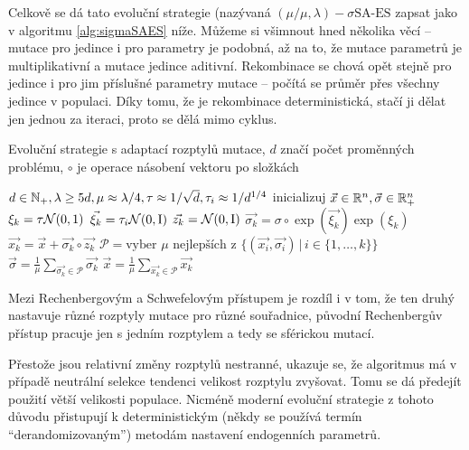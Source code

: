 Celkově se dá tato evoluční strategie (nazývaná $(\mu/\mu, \lambda)-\sigma\text{SA-ES}$ zapsat jako v algoritmu \ref{alg:sigmaSAES} níže. Můžeme si všimnout hned několika věcí -- mutace pro jedince i pro parametry je podobná, až na to, že mutace parametrů je multiplikativní a mutace jedince aditivní. Rekombinace se chová opět stejně pro jedince i pro jim příslušné parametry mutace -- počítá se průměr přes všechny jedince v populaci. Díky tomu, že je rekombinace deterministická, stačí ji dělat jen jednou za iteraci, proto se dělá mimo  cyklus.

\begin{algorithm}
\caption{Evoluční strategie s adaptací rozptylů mutace, $d$ značí počet proměnných problému, $\circ$ je operace násobení vektoru po složkách}
\label{alg:sigmaSAES}
\begin{algorithmic}
\Require $d \in {\mathbb{N}}_+, \lambda \geq 5d, \mu \approx \lambda/4, \tau \approx 1/\sqrt{d}, \tau_i \approx 1/d^{1/4}$
\State inicializuj $\vec{x} \in {\ensuremath{\mathbb{R}}}^n, \vec{\sigma} \in {\ensuremath{\mathbb{R}}}^n_+$
		\State $\xi_k = \tau\mathcal{N}(0, 1)$ 
		\State $\vec{\xi_k} = \tau_i\mathcal{N}(0, \mathrm{I})$ 
		\State $\vec{z_k} = \mathcal{N}(0, \mathrm{I})$ 
		\State $\vec{\sigma_k} = \sigma \circ \exp(\vec{\xi_k})\exp(\xi_k)$
		\State $\vec{x_k} = \vec{x} + \vec{\sigma_k}\circ\vec{z_k}$
	\EndFor
	\State $\mathcal{P} = \text{vyber } \mu \text{ nejlepších z } \{(\vec{x_i}, \vec{\sigma_i})\,|\,i \in \{1, \dots, k\}\}$
	\State $\vec{\sigma} = \frac{1}{\mu}\sum_{\vec{\sigma_k} \in \mathcal{P}}\vec{\sigma_k}$
	\State $\vec{x} = \frac{1}{\mu}\sum_{\vec{x_k} \in \mathcal{P}}\vec{x_k}$
\EndWhile
\EndProcedure
\end{algorithmic}
\end{algorithm}

Mezi Rechenbergovým a Schwefelovým přístupem je rozdíl i v tom, že ten druhý nastavuje různé rozptyly mutace pro různé souřadnice, původní Rechenbergův přístup pracuje jen s jedním rozptylem a tedy se sférickou mutací.

Přestože jsou relativní změny rozptylů nestranné, ukazuje se, že algoritmus má v případě neutrální selekce tendenci velikost rozptylu zvyšovat. Tomu se dá předejít použití větší velikosti populace. Nicméně moderní evoluční strategie z tohoto důvodu přistupují k deterministickým (někdy se používá termín ``derandomizovaným'') metodám nastavení endogenních parametrů.


